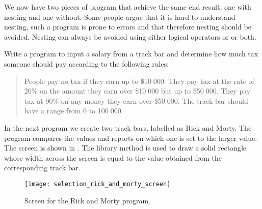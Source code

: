 		We now have two pieces of program that achieve the same end result, one with nesting and one without. Some people argue that it is hard to understand nesting, such a program is prone to errors and that therefore nesting should be avoided. Nesting can always be avoided using either logical operators or  or both.

		\begin{stqb}
			\begin{STQ}
				\item	Write a program to input a salary from a track bar and determine how much tax someone should pay according to the following rules:
					\begin{quote}
People pay no tax if they earn up to \$10 000. They pay tax at the rate of 20\% on the amount they earn over \$10 000 but up to \$50 000. They pay tax at 90\% on any money they earn over \$50 000. The track bar should have a range from 0 to 100 000.
					\end{quote}
			\end{STQ}
		\end{stqb}

		In the next program we create two track bars, labelled as Rick and Morty. The program compares the values and reports on which one is set to the larger value. The screen is shown in . The library method  is used to draw a solid rectangle whose width across the screen is equal to the value obtained from the corresponding track bar.

			\begin{figure}[th]
				\centering
				\texttt{[image: selection\_rick\_and\_morty\_screen]}
				\caption{Screen for the Rick and Morty program.}
				\label{fig:selection_rick_and_morty_screen}
			\end{figure}


